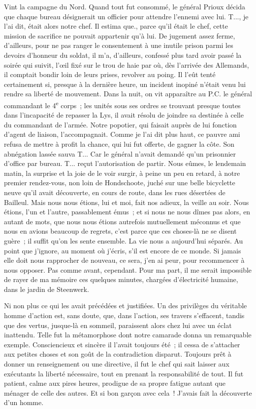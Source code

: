 \documentclass[french,twoside]{book} %
\begin{document}
Vint la campagne du Nord. Quand tout fut consommé, le général Prioux décida que chaque bureau désignerait un officier pour attendre l’ennemi avec lui. T..., je l’ai dit, était alors notre chef. Il estima que., parce qu’il était le chef, cette mission de sacrifice ne pouvait appartenir qu’à lui. De jugement assez ferme, d’ailleurs, pour ne pas ranger le consentement à une inutile prison parmi les devoirs d’honneur du soldat, il m’a, d’ailleurs, confessé plus tard avoir passé la soirée qui suivit, l’œil fixé sur le trou de haie par où, dès l’arrivée des Allemands, il comptait bondir loin de leurs prises, revolver au poing. Il l’eût tenté certainement si, presque à la dernière heure, un incident inopiné n’était venu lui rendre sa liberté de mouvement. Dans la nuit, on vit apparaître au P.C. le général commandant le 4\textsuperscript{e} corps ; les unités sous ses ordres se trouvant presque toutes dans l’incapacité de repasser la Lys, il avait résolu de joindre sa destinée à celle du commandant de l’armée. Notre popotier, qui faisait auprès de lui fonction d’agent de liaison,   l’accompagnait. Comme je l’ai dit plus haut, ce pauvre ami refusa de mettre à profit la chance, qui lui fut offerte, de gagner la côte. Son abnégation lassée sauva T... Car le général n’avait demandé qu’un prisonnier d’office par bureau. T... reçut l’autorisation de partir. Nous eûmes, le lendemain matin, la surprise et la joie de le voir surgir, à peine un peu en retard, à notre premier rendez-vous, non loin de Hondschoote, juché sur une belle bicyclette neuve qu’il avait découverte, en cours de route, dans les rues désertées de Bailleul. Mais nous nous étions, lui et moi, fait nos adieux, la veille au soir. Nous étions, l’un et l’autre, passablement émus ; et si nous ne nous dîmes pas alors, en autant de mots, que nous nous étions autrefois mutuellement méconnus et que nous en avions beaucoup de regrets, c’est parce que ces choses-là ne se disent guère ; il suffit qu’on les sente ensemble. La vie nous a aujourd’hui séparés. Au point que j’ignore, au moment où j’écris, s’il est encore de ce monde. Si jamais elle doit nous rapprocher de nouveau, ce sera, j’en ai peur, pour recommencer à nous opposer. Pas comme avant, cependant. Pour ma part, il me serait impossible de rayer de ma mémoire ces quelques minutes, chargées d’électricité humaine, dans le jardin de Steenwerk.\par
Ni non plus ce qui les avait précédées et justifiées. Un des privilèges du véritable homme d’action est, sans doute, que, dans l’action, ses travers s’effacent, tandis que des vertus, jusque-là en sommeil, paraissent alors chez lui avec un éclat inattendu. Telle fut la métamorphose dont notre camarade donna un remarquable exemple. Consciencieux et sincère il l’avait toujours été ; il cessa de s’attacher aux petites choses et son goût de la contradiction disparut. Toujours prêt à donner un renseignement ou une directive, il fut le chef qui sait laisser aux exécutants la liberté nécessaire, tout en prenant la responsabilité de tout. Il fut patient, calme aux pires heures, prodigue de sa propre fatigue autant que   ménager de celle des autres. Et si bon garçon avec cela ! J’avais fait la découverte d’un homme.\par
\end{document}
